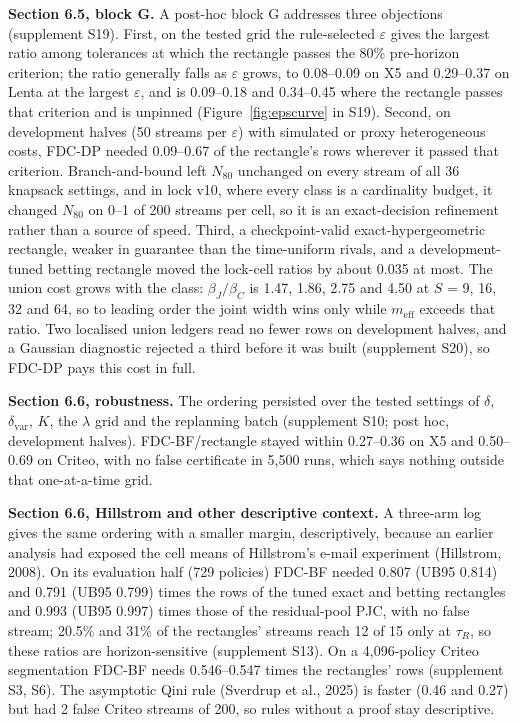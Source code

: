 \documentclass[sigconf,anonymous,review]{acmart}
\newcommand{\eps}{\varepsilon}
\newcommand{\dvar}{\delta_{\text{var}}}
\newcommand{\meff}{m_{\text{eff}}}
\begin{document}
\textbf{Section 6.5, block G.} A post-hoc block G addresses three objections (supplement S19). First, on the tested grid the rule-selected $\eps$ gives the largest ratio among tolerances at which the rectangle passes the 80\% pre-horizon criterion; the ratio generally falls as $\eps$ grows, to 0.08--0.09 on X5 and 0.29--0.37 on Lenta at the largest $\eps$, and is 0.09--0.18 and 0.34--0.45 where the rectangle passes that criterion and is unpinned (Figure~\ref{fig:epscurve} in S19). Second, on development halves (50 streams per $\eps$) with simulated or proxy heterogeneous costs, FDC-DP needed 0.09--0.67 of the rectangle's rows wherever it passed that criterion. Branch-and-bound left $N_{80}$ unchanged on every stream of all 36 knapsack settings, and in lock v10, where every class is a cardinality budget, it changed $N_{80}$ on 0--1 of 200 streams per cell, so it is an exact-decision refinement rather than a source of speed. Third, a checkpoint-valid exact-hypergeometric rectangle, weaker in guarantee than the time-uniform rivals, and a development-tuned betting rectangle moved the lock-cell ratios by about 0.035 at most. The union cost grows with the class: $\beta_J/\beta_C$ is 1.47, 1.86, 2.75 and 4.50 at $S$ = 9, 16, 32 and 64, so to leading order the joint width wins only while $\meff$ exceeds that ratio. Two localised union ledgers read no fewer rows on development halves, and a Gaussian diagnostic rejected a third before it was built (supplement S20), so FDC-DP pays this cost in full.

\textbf{Section 6.6, robustness.} The ordering persisted over the tested settings of $\delta$, $\dvar$, $K$, the $\lambda$ grid and the replanning batch (supplement S10; post hoc, development halves). FDC-BF/rectangle stayed within 0.27--0.36 on X5 and 0.50--0.69 on Criteo, with no false certificate in 5,500 runs, which says nothing outside that one-at-a-time grid.

\textbf{Section 6.6, Hillstrom and other descriptive context.} A three-arm log gives the same ordering with a smaller margin, descriptively, because an earlier analysis had exposed the cell means of Hillstrom's e-mail experiment (Hillstrom, 2008). On its evaluation half (729 policies) FDC-BF needed 0.807 (UB95 0.814) and 0.791 (UB95 0.799) times the rows of the tuned exact and betting rectangles and 0.993 (UB95 0.997) times those of the residual-pool PJC, with no false stream; 20.5\% and 31\% of the rectangles' streams reach 12 of 15 only at $\tau_R$, so these ratios are horizon-sensitive (supplement S13). On a 4,096-policy Criteo segmentation FDC-BF needs 0.546--0.547 times the rectangles' rows (supplement S3, S6). The asymptotic Qini rule (Sverdrup et al., 2025) is faster (0.46 and 0.27) but had 2 false Criteo streams of 200, so rules without a proof stay descriptive.
\end{document}
